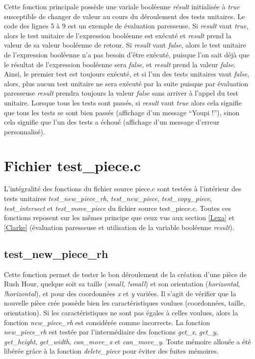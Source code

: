 \documentclass{report}
\begin{document}
Cette fonction principale possède une variale booléenne \emph{résult} initialisée à \emph{true} susceptible de changer de valeur au cours du déroulement des tests unitaires. Le code des lignes 5 à 9 est un exemple de évaluation paresseuse. Si \emph{result} vaut \emph{true}, alors le test unitaire de l'expression booléenne est exécuté et \emph{result} prend la valeur de sa valeur booléenne de retour. Si \emph{result} vaut \emph{false}, alors le test unitaire de l'expression booléenne n'a pas besoin d'être exécuté, puisque l'on sait déjà que le résultat de l'expression booléenne sera \emph{false}, et \emph{result} prend la valeur \emph{false}. Ainsi, le premier test est toujours exécuté, et si l'un des tests unitaires vaut \emph{false}, alors, plus aucun test unitaire ne sera exécuté par la suite puisque par évaluation paresseuse \emph{result} prendra toujours la valeur \emph{false} sans arriver à l'appel du test unitaire. Lorsque tous les tests sont passés, si \emph{result} vaut \emph{true} alors cela signifie que tous les tests se sont bien passés (affichage d'un message ``Youpi !''), sinon cela signifie que l'un des tests a échoué (affichage d'un message d'erreur personnalisé).

\section{Fichier test\_piece.c}
L'intégralité des fonctions du fichier source piece.c sont testées à l'intérieur des tests unitaires \emph{test\_new\_piece\_rh}, \emph{test\_new\_piece}, \emph{test\_copy\_piece}, \emph{test\_intersect} et \emph{test\_move\_piece} du fichier source test\_piece.c. Toutes ces fonctions reposent sur les mêmes principe que ceux vus aux section \ref{Lexa} et \ref{Clarke} (évaluation paresseuse et utilisation de la variable booléenne \emph{result}).
\subsection{test\_new\_piece\_rh}
Cette fonction permet de tester le bon déroulement de la création d'une pièce de Rush Hour, quelque soit sa taille (\emph{small}, \emph{!small}) et son orientation (\emph{horizontal}, \emph{!horizontal}), et pour des coordonnées \emph{x} et \emph{y} variées. Il s'agit de vérifier que la nouvelle pièce crée possède bien les caractéristiques voulues (coordonnées, taille, orientation). Si les caractéristiques ne sont pas égales à celles voulues, alors la fonction \emph{new\_piece\_rh} est considérée comme incorrecte. La fonction \emph{new\_piece\_rh} est testée par l'intermédiaire des fonctions  \emph{get\_x}, \emph{get\_y}, \emph{get\_height}, \emph{get\_width}, \emph{can\_move\_x} et \emph{can\_move\_y}. Toute mémoire allouée a été libérée grâce à la fonction \emph{delete\_piece} pour éviter des fuites mémoires.
\end{document}
